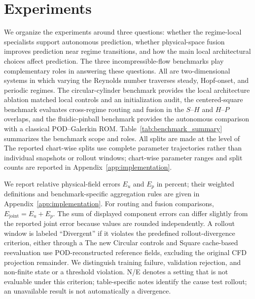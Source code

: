 \documentclass{article}
\providecommand{\DIFaddtex}[1]{{\protect\color{blue} \sf #1}} %
\providecommand{\DIFdeltex}[1]{{\protect\color{red} \scriptsize #1}} %
\providecommand{\DIFaddbegin}{} %
\providecommand{\DIFaddend}{} %
\providecommand{\DIFdelbegin}{} %
\providecommand{\DIFdelend}{} %
\providecommand{\DIFadd}[1]{\texorpdfstring{\DIFaddtex{#1}}{#1}} %
\providecommand{\DIFdel}[1]{\texorpdfstring{\DIFdeltex{#1}}{}} %
\begin{document}
\DIFaddend \section{Experiments}
\label{sec:experiments}

We organize the experiments around three questions: whether the regime-local specialists support autonomous prediction, whether
physical-space fusion improves prediction near regime transitions, and how the main local architectural choices affect prediction.
The three incompressible-flow benchmarks play complementary roles in answering these questions. All are two-dimensional systems in which varying the Reynolds number traverses steady, Hopf-onset, and periodic regimes. The circular-cylinder benchmark provides \DIFdelbegin \DIFdel{the local architecture ablation}\DIFdelend \DIFaddbegin \DIFadd{matched local controls and an initialization audit}\DIFaddend , the centered-square benchmark evaluates cross-regime routing and fusion in the $S$--$H$ and $H$--$P$ overlaps, and the fluidic-pinball benchmark provides the autonomous comparison with a classical POD--Galerkin ROM. Table~\ref{tab:benchmark_summary} summarizes the benchmark scope and roles. \DIFdelbegin \DIFdel{All splits are made at the level of }\DIFdelend \DIFaddbegin \DIFadd{The reported chart-wise splits use }\DIFaddend complete parameter trajectories rather than individual snapshots or rollout windows; chart-wise parameter ranges and split counts are reported in Appendix~\ref{app:implementation}.

We report relative physical-field errors $E_u$ and $E_p$ in percent; their weighted definitions and benchmark-specific aggregation rules are given in Appendix~\ref{app:implementation}. For routing and fusion comparisons, $E_{\mathrm{joint}}=E_u+E_p$. The sum of displayed component errors can differ slightly from the reported joint error because values are rounded independently. \DIFdelbegin \DIFdel{A rollout window is labeled ``Divergent'' if it violates the predefined rollout-divergence criterion, either through a }\DIFdelend \DIFaddbegin \DIFadd{The new Circular controls and Square cache-based reevaluation use
POD-reconstructed reference fields, excluding the original CFD projection
remainder. We distinguish training failure, validation rejection, and
}\DIFaddend non-finite \DIFdelbegin \DIFdel{state or a
threshold violation. N/E denotes a setting that is not evaluable under this criterion; table-specific notes identify the cause}\DIFdelend \DIFaddbegin \DIFadd{test rollout; an unavailable result is not automatically a
divergence}\DIFaddend . 
\end{document}
